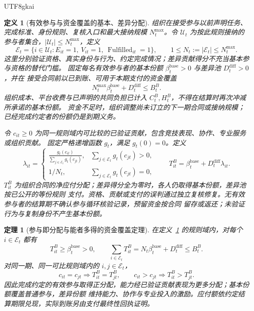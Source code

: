 \documentclass[12pt,a4paper,openany]{report}
\newtheorem{definition}{定义}[chapter]
\newtheorem{theorem}{定理}[chapter]
\begin{document}
\begin{CJK*}{UTF8}{gkai}
\begin{definition}[有效参与与资金覆盖的基本、差异分配]
\label{def:base-differential-distribution}
组织在接受参与以前声明任务、完成标准、身份规则、复核入口和最大接纳规模 \(N_t^{\max}\)。令
\(\mathcal U_t\) 为按此规则接纳的参与者集合，\(|\mathcal U_t|\le N_t^{\max}\)，定义
\[
  \mathcal E_t=
  \{i\in\mathcal U_t:E_{it}=1,\ V_{it}=1,\ \operatorname{Fulfilled}_{it}=1\},
  \qquad 1\le N_t:=|\mathcal E_t|\le N_t^{\max}.
\]
这里分别验证资格、真实身份与行为、约定完成情况；差异贡献得分不充当基本参与资格的替代门槛。
固定每名有效参与者的基本份额 \(\beta_t^{\mathrm{base}}>0\) 与差异池 \(D_t^{\mathrm{diff}}>0\)，并在
接受合同前以已到账、可用于本期支付的资金覆盖
\[
  N_t^{\max}\beta_t^{\mathrm{base}}+D_t^{\mathrm{diff}}\le B_t^B.
\]
组织成本、平台收费与已声明的共同负担已计入 \(C_t^B,H_t^B\)，不得在结算时再次冲减所承诺的基本份额。
资金不足时，组织调整尚未订立的下一期合同或接纳规模；已经完成约定者的份额仍是到期义务。

令 \(c_{it}\ge0\) 为同一规则域内可比较的已验证贡献，包含竞技表现、协作、专业服务或组织贡献。
固定严格递增函数 \(g_t\)，满足 \(g_t(0)=0\)。定义
\[
  \lambda_{it}=
  \begin{cases}
    \displaystyle\frac{g_t(c_{it})}{\sum_{j\in\mathcal E_t}g_t(c_{jt})},
       &\sum_{j\in\mathcal E_t}g_t(c_{jt})>0,\\[1.2ex]
    1/N_t,&\sum_{j\in\mathcal E_t}g_t(c_{jt})=0,
  \end{cases}
  \qquad
  T_{it}^B=\beta_t^{\mathrm{base}}+D_t^{\mathrm{diff}}\lambda_{it}.
\]
\(T_{it}^B\) 为组织合同的净应付分配；差异得分全为零时，各人仍取得基本份额，差异池按已公开的等份规则
支付。资格、贡献或支付的误判通过独立复核修复。无有效参与者的结算期不确认参与循环核验记录，预留资金按合同
留存或返还；未验证行为与复制身份不产生基本份额。
\end{definition}

\begin{theorem}[参与即分配与能者多得的资金覆盖定理]
\label{thm:base-differential-coverage}
在定义~\ref{def:base-differential-distribution} 的规则域内，对每个 \(i\in\mathcal E_t\) 都有
\[
  T_{it}^B\ge\beta_t^{\mathrm{base}}>0,
  \qquad
  \sum_{i\in\mathcal E_t}T_{it}^B
  =N_t\beta_t^{\mathrm{base}}+D_t^{\mathrm{diff}}\le B_t^B.
\]
对同一期、同一可比规则域内的 \(i,j\in\mathcal E_t\)，
\[
  c_{it}=c_{jt}\Longrightarrow T_{it}^B=T_{jt}^B,
  \qquad
  c_{it}>c_{jt}\Longrightarrow T_{it}^B>T_{jt}^B.
\]
因此完成约定的有效参与取得正分配，能力经已验证贡献表现为更多分配；基本份额覆盖普通参与，差异份额
维持能力、协作与专业投入的激励。应付额依约定结算期限兑现，实际到账另由支付最终性回执证明。
\end{theorem}


\end{CJK*}
\end{document}
